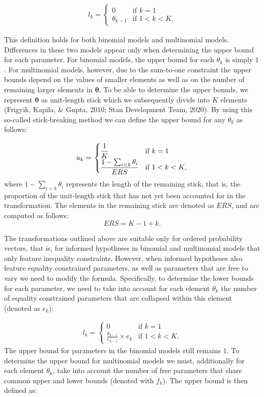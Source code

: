 \begin{appendix}
\begin{align*}
  l_k = \left.
  \begin{cases}
      0 & \text{if } k = 1 \\
      \theta_{k - 1} & \text{if } 1 < k < K.
  \end{cases}
    \right.
\end{align*}

This definition holds for both binomial models and multinomial models.
Differences in these two models appear only when determining the upper
bound for each parameter. For binomial models, the upper bound for each
\(\theta_k\) is simply \(1\). For multinomial models, however, due to
the sum-to-one constraint the upper bounds depend on the values of
smaller elements as well as on the number of remaining larger elements
in \(\boldsymbol{\theta}\). To be able to determine the upper bounds, we
represent \(\boldsymbol{\theta}\) as unit-length stick which we
subsequently divide into \(K\) elements (Frigyik, Kapila, \& Gupta,
2010; Stan Development Team, 2020). By using this so-called
stick-breaking method we can define the upper bound for any \(\theta_k\)
as follows:

\begin{align}
\label{Eq:upperBound}
  u_k = \left.
  \begin{cases}
      \cfrac{1}{K} & \text{if } k = 1 \\
      \cfrac{1 - \sum_{i < k} \theta_i}{ERS} & \text{if } 1 < k < K,
  \end{cases}
    \right.
\end{align} where \(1 - \sum_{i < k} \theta_i\) represents the length of
the remaining stick, that is, the proportion of the unit-length stick
that has not yet been accounted for in the transformation. The elements
in the remaining stick are denoted as \(ERS\), and are computed as
follows: \[ERS = K - 1 + k.\]

The transformations outlined above are suitable only for ordered
probability vectors, that is, for informed hypotheses in binomial and
multinomial models that only feature inequality constraints. However,
when informed hypotheses also feature equality constrained parameters,
as well as parameters that are free to vary we need to modify the
formula. Specifically, to determine the lower bounds for each parameter,
we need to take into account for each element \(\theta_k\) the number of
equality constrained parameters that are collapsed within this element
(denoted as \(e_k\)):

\begin{align}
  l_k = \left.
  \begin{cases}
      0 & \text{if } k = 1 \\
      \frac{\theta_{k - 1}}{e_{k-1}} \times e_k & \text{if } 1 < k < K.
  \end{cases}
    \right.
\end{align} The upper bound for parameters in the binomial models still
remains \(1\). To determine the upper bound for multinomial models we
must, additionally for each element \(\theta_k\), take into account the
number of free parameters that share common upper and lower bounds
(denoted with \(f_k\)). The upper bound is then defined as:


\end{appendix}
